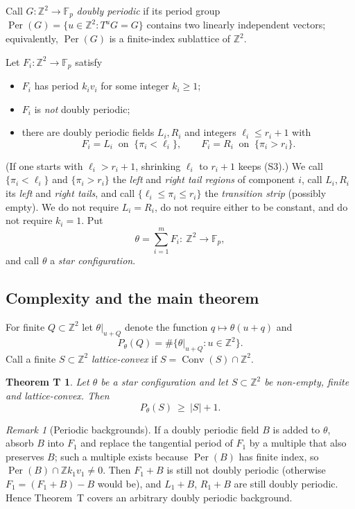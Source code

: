 \documentclass[11pt,reqno]{amsart}
\theoremstyle{plain}
\theoremstyle{definition}
\theoremstyle{remark}
\newtheorem{rem}[thm]{Remark}
\theoremstyle{plain}
\newtheorem*{thmT}{Theorem T}
\theoremstyle{remark}
\theoremstyle{definition}
\numberwithin{equation}{section}
\DeclareMathOperator{\Per}{Per}
\DeclareMathOperator{\Conv}{Conv}
\newcommand{\Z}{\mathbb{Z}}
\newcommand{\Fp}{\mathbb{F}_p}
\begin{document}
Call $G\colon\Z^2\to\Fp$ \emph{doubly periodic} if its period group
$\Per(G)=\{u\in\Z^2:T^uG=G\}$ contains two linearly independent vectors;
equivalently, $\Per(G)$ is a finite-index sublattice of $\Z^2$.

Let $F_i\colon\Z^2\to\Fp$ satisfy
\begin{itemize}
\item[\textup{(S1)}] $F_i$ has period $k_iv_i$ for some integer $k_i\ge1$;
\item[\textup{(S2)}] $F_i$ is \emph{not} doubly periodic;
\item[\textup{(S3)}] there are doubly periodic fields $L_i,R_i$ and integers
      $\ell_i\le r_i+1$ with
      \[F_i=L_i\ \text{ on }\ \{\pi_i<\ell_i\},\qquad
        F_i=R_i\ \text{ on }\ \{\pi_i>r_i\}.\]
\end{itemize}
(If one starts with $\ell_i>r_i+1$, shrinking $\ell_i$ to $r_i+1$ keeps
\textup{(S3)}.)  We call $\{\pi_i<\ell_i\}$ and $\{\pi_i>r_i\}$ the \emph{left}
and \emph{right tail regions} of component $i$, call $L_i,R_i$ its \emph{left}
and \emph{right tails}, and call $\{\ell_i\le\pi_i\le r_i\}$ the
\emph{transition strip} (possibly empty).  We do not require $L_i=R_i$, do not
require either to be constant, and do not require $k_i=1$.  Put
\[\theta=\sum_{i=1}^mF_i\colon\ \Z^2\to\Fp,\]
and call $\theta$ a \emph{star configuration}.

\subsection{Complexity and the main theorem}\label{ssec:main}

For finite $Q\subset\Z^2$ let $\theta|_{u+Q}$ denote the function
$q\mapsto\theta(u+q)$ and
\[P_\theta(Q)=\#\{\theta|_{u+Q}:u\in\Z^2\}.\]
Call a finite $S\subset\Z^2$ \emph{lattice-convex} if $S=\Conv(S)\cap\Z^2$.

\begin{thmT}
Let $\theta$ be a star configuration and let $S\subset\Z^2$ be non-empty,
finite and lattice-convex.  Then
\[P_\theta(S)\ \ge\ |S|+1 .\]
\end{thmT}

\begin{rem}[Periodic backgrounds]\label{rem:background}
If a doubly periodic field $B$ is added to $\theta$, absorb $B$ into $F_1$ and
replace the tangential period of $F_1$ by a multiple that also preserves $B$;
such a multiple exists because $\Per(B)$ has finite index, so
$\Per(B)\cap\Z k_1v_1\ne0$.  Then $F_1+B$ is still not doubly periodic
(otherwise $F_1=(F_1+B)-B$ would be), and $L_1+B$, $R_1+B$ are still doubly
periodic.  Hence Theorem~T covers an arbitrary doubly periodic
background.
\end{rem}
\end{document}
